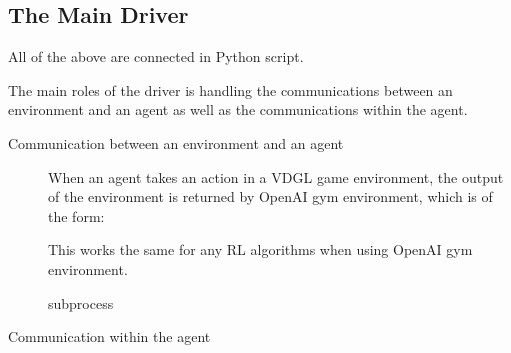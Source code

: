 \subsection{The Main Driver}
All of the above are connected in Python script.

The main roles of the driver is handling the communications between an environment and an agent as well as the communications within the agent.

\begin{description}
\item[Communication between an environment and an agent]

When an agent takes an action in a VDGL game environment, 
the output of the environment is returned by OpenAI gym environment, which is of the form:

This works the same for any RL algorithms when using OpenAI gym environment. 


subprocess

\item[Communication within the agent]

\end{description}
    